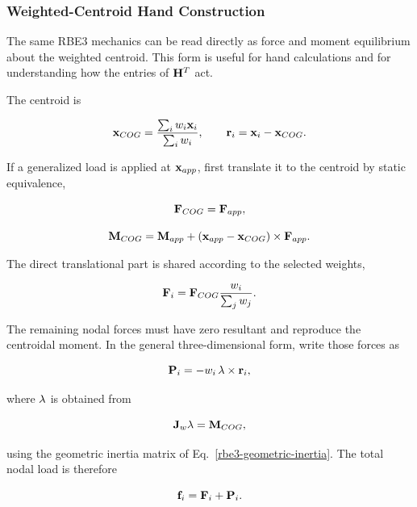 \subsubsection{Weighted-Centroid Hand Construction}

The same RBE3 mechanics can be read directly as force and moment equilibrium
about the weighted centroid. This form is useful for hand calculations and for
understanding how the entries of $\mathbf{H}^T$ act.

The centroid is

\begin{equation}
    \mathbf{x}_{COG}=\frac{\sum_i w_i\mathbf{x}_i}{\sum_iw_i},
    \qquad
    \mathbf{r}_i=\mathbf{x}_i-\mathbf{x}_{COG}.
\end{equation}

If a generalized load is applied at $\mathbf{x}_{app}$, first translate it to the
centroid by static equivalence,

\begin{equation}
    \mathbf{F}_{COG}=\mathbf{F}_{app},
\end{equation}

\begin{equation}
    \mathbf{M}_{COG}=\mathbf{M}_{app}
      +(\mathbf{x}_{app}-\mathbf{x}_{COG})\times\mathbf{F}_{app}.
\end{equation}

The direct translational part is shared according to the selected weights,

\begin{equation}\label{rbe3-hand-direct-force}
    \mathbf{F}_i=\mathbf{F}_{COG}\frac{w_i}{\sum_jw_j}.
\end{equation}

The remaining nodal forces must have zero resultant and reproduce the centroidal
moment. In the general three-dimensional form, write those forces as

\begin{equation}\label{rbe3-hand-moment-forces}
    \mathbf{P}_i=-w_i\,\mathbf{\lambda}\times\mathbf{r}_i,
\end{equation}

where $\mathbf{\lambda}$ is obtained from

\begin{equation}
    \mathbf{J}_w\mathbf{\lambda}=\mathbf{M}_{COG},
\end{equation}

using the geometric inertia matrix of Eq.~\eqref{rbe3-geometric-inertia}. The
total nodal load is therefore

\begin{equation}
    \mathbf{f}_i=\mathbf{F}_i+\mathbf{P}_i.
\end{equation}

